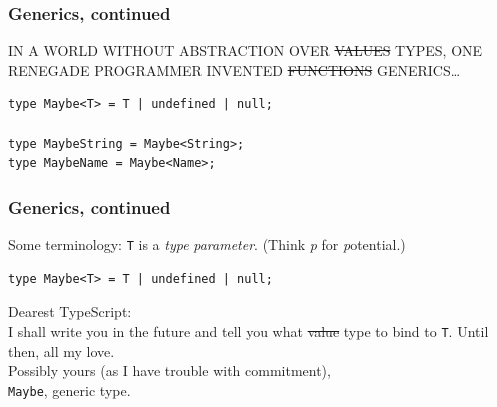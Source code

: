 \documentclass[aspectratio=169]{beamer}
\begin{document}
\begin{frame}[fragile]
  \frametitle{Generics, continued}

  IN A WORLD WITHOUT ABSTRACTION OVER \sout{VALUES} TYPES, ONE RENEGADE
  PROGRAMMER INVENTED \sout{FUNCTIONS} GENERICS\ldots \\

  \begin{verbatim}
type Maybe<T> = T | undefined | null;

type MaybeString = Maybe<String>;
type MaybeName = Maybe<Name>;
  \end{verbatim}
\end{frame}

\begin{frame}[fragile]
  \frametitle{Generics, continued}

  Some terminology: \texttt{T} is a \emph{type} \textit{parameter}. (Think
  \textit{p} for \textit{p}otential.) \\

  \begin{verbatim}
type Maybe<T> = T | undefined | null;
  \end{verbatim}

  \vspace{1em}

  \begin{tcolorbox}
    Dearest TypeScript: \\

    I shall write you in the future and tell you what \sout{value} type to
    bind to \texttt{T}. Until then, all my love. \\

    Possibly yours (as I have trouble with commitment), \\
    \texttt{Maybe}, generic type.
  \end{tcolorbox}
\end{frame}
\end{document}
